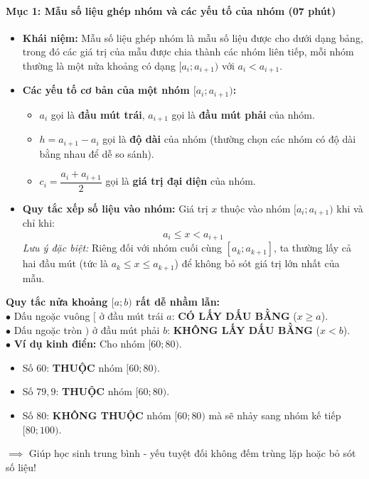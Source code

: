 \documentclass[12pt, a4paper]{article}
\begin{document}
\paragraph{Mục 1: Mẫu số liệu ghép nhóm và các yếu tố của nhóm (07 phút)}
\begin{itemize}
    \item \textbf{Khái niệm:} Mẫu số liệu ghép nhóm là mẫu số liệu được cho dưới dạng bảng, trong đó các giá trị của mẫu được chia thành các nhóm liên tiếp, mỗi nhóm thường là một nửa khoảng có dạng $[a_i; a_{i+1})$ với $a_i < a_{i+1}$.
    \item \textbf{Các yếu tố cơ bản của một nhóm $[a_i; a_{i+1})$:}
    \begin{itemize}
        \item $a_i$ gọi là \textbf{đầu mút trái}, $a_{i+1}$ gọi là \textbf{đầu mút phải} của nhóm.
        \item $h = a_{i+1} - a_i$ gọi là \textbf{độ dài} của nhóm (thường chọn các nhóm có độ dài bằng nhau để dễ so sánh).
        \item $c_i = \dfrac{a_i + a_{i+1}}{2}$ gọi là \textbf{giá trị đại diện} của nhóm.
    \end{itemize}
    \item \textbf{Quy tắc xếp số liệu vào nhóm:} Giá trị $x$ thuộc vào nhóm $[a_i; a_{i+1})$ khi và chỉ khi:
    $$a_i \le x < a_{i+1}$$
    \textit{Lưu ý đặc biệt:} Riêng đối với nhóm cuối cùng $[a_k; a_{k+1}]$, ta thường lấy cả hai đầu mút (tức là $a_k \le x \le a_{k+1}$) để không bỏ sót giá trị lớn nhất của mẫu.
\end{itemize}

\begin{scaffoldbox}
    \textbf{Quy tắc nửa khoảng $[a; b)$ rất dễ nhầm lẫn:}\\
    $\bullet$ Dấu ngoặc vuông $[$ ở đầu mút trái $a$: \textbf{CÓ LẤY DẤU BẰNG} ($x \ge a$).\\
    $\bullet$ Dấu ngoặc tròn $)$ ở đầu mút phải $b$: \textbf{KHÔNG LẤY DẤU BẰNG} ($x < b$).\\
    $\bullet$ \textbf{Ví dụ kinh điển:} Cho nhóm $[60; 80)$.
    \begin{itemize}
        \item Số $60$: \textbf{THUỘC} nhóm $[60; 80)$.
        \item Số $79{,}9$: \textbf{THUỘC} nhóm $[60; 80)$.
        \item Số $80$: \textbf{KHÔNG THUỘC} nhóm $[60; 80)$ mà sẽ nhảy sang nhóm kế tiếp $[80; 100)$.
    \end{itemize}
    $\implies$ Giúp học sinh trung bình - yếu tuyệt đối không đếm trùng lặp hoặc bỏ sót số liệu!
\end{scaffoldbox}
\end{document}
